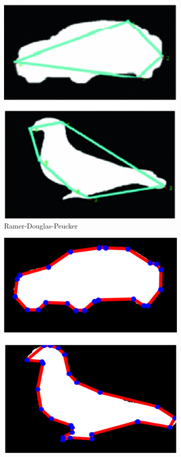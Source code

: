 \documentclass[10pt,twocolumn,letterpaper]{article}
\begin{document}
\begin{figure}
\begin{subfigure}[t]{0.15\textwidth}
        \includegraphics[width=\textwidth]{images/shape_bad}
        \caption{Ramer-Douglas-Peucker}
    \end{subfigure}
    \hfill
    \begin{subfigure}[t]{0.15\textwidth}
        \centering
        \includegraphics[width=\textwidth]{images/shape_good}

\end{subfigure}
\end{figure}
\end{document}
